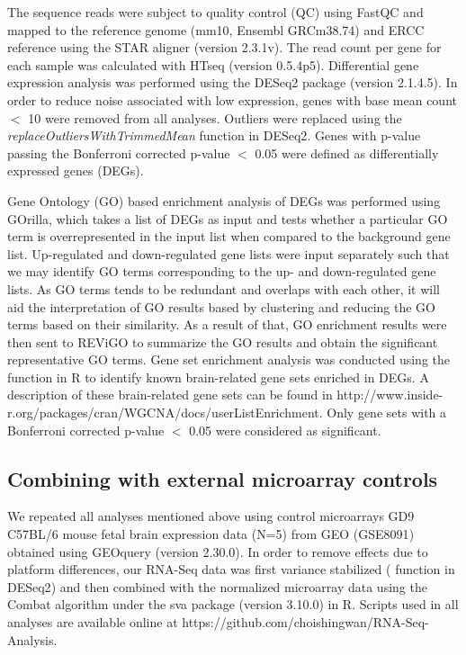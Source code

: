 The sequence reads were subject to quality control (QC) using FastQC \cite{SimonAndrews} and mapped to the  reference genome (mm10, Ensembl GRCm38.74) and ERCC reference using the STAR aligner (version 2.3.1v)\cite{Dobin2013}.
The read count per gene for each sample was calculated with HTseq (version 0.5.4p5)\cite{Anders.2011}.
Differential gene expression analysis was performed using the DESeq2 package (version 2.1.4.5)\cite{Anders2010}.
In order to reduce noise associated with low expression, genes with base mean count $<$ 10 were removed from all analyses.
Outliers were replaced using the \textit{replaceOutliersWithTrimmedMean} function in DESeq2\cite{Anders2010}. Genes with p-value passing the Bonferroni corrected p-value $<$ 0.05 were defined as differentially expressed genes (DEGs). 

Gene Ontology (GO) based enrichment analysis of DEGs was performed using GOrilla\cite{Eden2009}, which takes a list of DEGs as input and tests whether a particular GO term is overrepresented in the input list when compared to the background gene list.
Up-regulated and down-regulated gene lists were input separately such that we may identify GO terms corresponding to the up- and down-regulated gene lists.
As GO terms tends to be redundant and overlaps with each other, it will aid the interpretation of GO results based by clustering and reducing the GO terms based on their similarity. 
As a result of that, GO enrichment results were then sent to REViGO\cite{Supek2011} to summarize the GO results and obtain the significant representative GO terms.
Gene set enrichment analysis was conducted using the \cite{Miller2011} function in R to identify known brain-related gene sets enriched in DEGs.
A description of these brain-related gene sets can be found in http://www.inside-r.org/packages/cran/WGCNA/docs/userListEnrichment.
Only gene sets with a Bonferroni corrected p-value $<$ 0.05 were considered as significant. 

\subsection{Combining with external microarray controls}
We repeated all analyses mentioned above using control microarrays GD9 C57BL/6 mouse fetal brain expression data (N=5) from GEO (GSE8091\cite{Hartl2008}) obtained using GEOquery (version 2.30.0)\cite{Davis2007}.
In order to remove effects due to platform differences, our RNA-Seq data was first variance stabilized ( function in DESeq2\cite{Anders2010}) and then combined with the normalized microarray data using the Combat algorithm\cite{Johnson2007} under the sva package (version 3.10.0) in R.
Scripts used in all analyses are available online at https://github.com/choishingwan/RNA-Seq-Analysis. 

